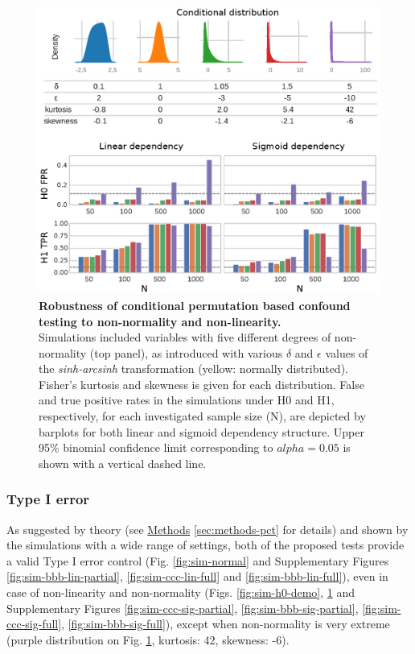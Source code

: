 \documentclass{article}
\begin{document}
\begin{figure}[!b]
  \centering

  \includegraphics[width=0.5\paperwidth]{fig/sim_non-norm.eps}
  \caption{\textbf{Robustness of conditional permutation based confound testing to non-normality and non-linearity.} \\
  Simulations included variables with five different degrees of non-normality (top panel), as introduced with various $\delta$ and $\epsilon$ values of the \emph{sinh-arcsinh} transformation (yellow: normally distributed). Fisher's kurtosis and skewness is given for each distribution. False and true positive rates in the simulations under H0 and H1, respectively, for each investigated sample size (N), are depicted by barplots for both linear and sigmoid dependency structure. Upper 95\% binomial confidence limit corresponding to $alpha=0.05$ is shown with a vertical dashed line.}
  \label{fig:sim-non-normal}
\end{figure}

\subsubsection*{Type I error}

As suggested by theory (see \hyperref[sec:methods]{Methods} \ref{sec:methods-pct} for details) and shown by the simulations with a wide range of settings, both of the proposed tests provide a valid Type I error control (Fig. \ref{fig:sim-normal} and Supplementary Figures \ref{fig:sim-bbb-lin-partial}, \ref{fig:sim-ccc-lin-full} and \ref{fig:sim-bbb-lin-full}), even in case of non-linearity and non-normality (Figs. \ref{fig:sim-h0-demo}, \ref{fig:sim-non-normal} and Supplementary Figures \ref{fig:sim-ccc-sig-partial}, \ref{fig:sim-bbb-sig-partial}, \ref{fig:sim-ccc-sig-full}, \ref{fig:sim-bbb-sig-full}), except when non-normality is very extreme (purple distribution on Fig. \ref{fig:sim-non-normal}, kurtosis: 42, skewness: -6).
\end{document}
